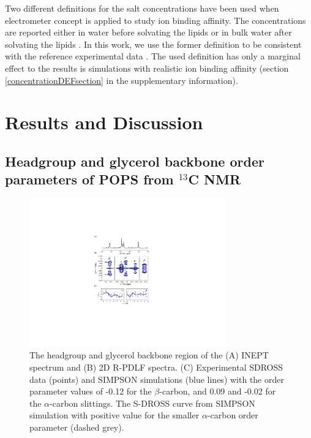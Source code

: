 \documentclass[aps,prl,superscriptaddress,twocolumn]{revtex4}
\begin{document}
Two different definitions for the salt concentrations have been used when
electrometer concept is applied to study ion binding affinity.
The concentrations are reported either in water before solvating the lipids \cite{akutsu81,roux90,catte16}
or in bulk water after solvating the lipids \cite{altenbach84,melcr18}.
In this work, we use the former definition to be consistent with the reference
experimental data \cite{roux90}. The used definition has only a marginal effect
to the results is simulations with realistic ion binding affinity
(section \ref{concentrationDEFsection} in the supplementary information).

\section{Results and Discussion}

\subsection{Headgroup and glycerol backbone order parameters of POPS from $^{13}$C NMR}

\begin{figure}[!tb]
  \centering
  \includegraphics[width=8.5cm]{../Figs/fig1_POPS.pdf}
  \caption{\label{PShgSIGNSsimpson}
    The headgroup and glycerol backbone region of the (A) INEPT spectrum and
    (B) 2D R-PDLF spectra.
    (C) Experimental SDROSS data (points) and SIMPSON simulations (blue lines) with
    the order parameter values of -0.12 for the $\beta$-carbon, and 0.09 and -0.02
    for the $\alpha$-carbon slittings. The S-DROSS curve from SIMPSON simulation with positive value
    for the smaller $\alpha$-carbon order parameter (dashed grey).
  }
\end{figure}
\end{document}
